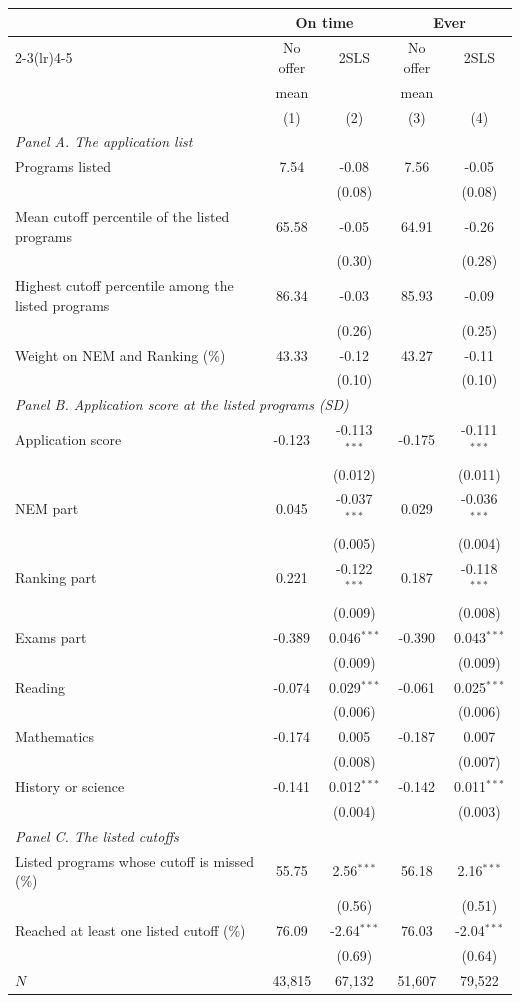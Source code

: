 \begin{tabular}{lcccc}
\toprule
 & \multicolumn{2}{c}{On time} & \multicolumn{2}{c}{Ever}\\
\cmidrule(lr){2-3}\cmidrule(lr){4-5}
 & No offer & 2SLS & No offer & 2SLS\\
 & mean &  & mean & \\
 & (1) & (2) & (3) & (4)\\
\midrule
\multicolumn{5}{l}{\textit{Panel A. The application list}}\\
\quad Programs listed & 7.54 & -0.08 & 7.56 & -0.05\\
 &  & (0.08) &  & (0.08)\\
\quad Mean cutoff percentile of the listed programs & 65.58 & -0.05 & 64.91 & -0.26\\
 &  & (0.30) &  & (0.28)\\
\quad Highest cutoff percentile among the listed programs & 86.34 & -0.03 & 85.93 & -0.09\\
 &  & (0.26) &  & (0.25)\\
\quad Weight on NEM and Ranking (\%) & 43.33 & -0.12 & 43.27 & -0.11\\
 &  & (0.10) &  & (0.10)\\
\midrule
\multicolumn{5}{l}{\textit{Panel B. Application score at the listed programs (SD)}}\\
\quad Application score & -0.123 & -0.113$^{***}$ & -0.175 & -0.111$^{***}$\\
 &  & (0.012) &  & (0.011)\\
\quad\quad NEM part & 0.045 & -0.037$^{***}$ & 0.029 & -0.036$^{***}$\\
 &  & (0.005) &  & (0.004)\\
\quad\quad Ranking part & 0.221 & -0.122$^{***}$ & 0.187 & -0.118$^{***}$\\
 &  & (0.009) &  & (0.008)\\
\quad\quad Exams part & -0.389 & 0.046$^{***}$ & -0.390 & 0.043$^{***}$\\
 &  & (0.009) &  & (0.009)\\
\quad\quad\quad Reading & -0.074 & 0.029$^{***}$ & -0.061 & 0.025$^{***}$\\
 &  & (0.006) &  & (0.006)\\
\quad\quad\quad Mathematics & -0.174 & 0.005 & -0.187 & 0.007\\
 &  & (0.008) &  & (0.007)\\
\quad\quad\quad History or science & -0.141 & 0.012$^{***}$ & -0.142 & 0.011$^{***}$\\
 &  & (0.004) &  & (0.003)\\
\midrule
\multicolumn{5}{l}{\textit{Panel C. The listed cutoffs}}\\
\quad Listed programs whose cutoff is missed (\%) & 55.75 & 2.56$^{***}$ & 56.18 & 2.16$^{***}$\\
 &  & (0.56) &  & (0.51)\\
\quad Reached at least one listed cutoff (\%) & 76.09 & -2.64$^{***}$ & 76.03 & -2.04$^{***}$\\
 &  & (0.69) &  & (0.64)\\
\midrule
$N$ & 43,815 & 67,132 & 51,607 & 79,522\\
\bottomrule
\end{tabular}
